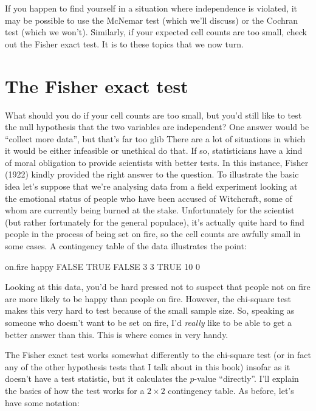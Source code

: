 \noindent
If you happen to find yourself in a situation where independence is violated, it may be possible to use the McNemar test (which we'll discuss) or the Cochran test (which we won't). Similarly, if your expected cell counts are too small, check out the Fisher exact test. It is to these topics that we now turn. 


\section{The Fisher exact test~\label{sec:fisherexacttest}}

What should you do if your cell counts are too small, but you'd still like to test the null hypothesis that the two variables are independent? One answer would be ``collect more data'', but that's far too glib There are a lot of situations in which it would be either infeasible or unethical do that. If so, statisticians have a kind of moral obligation to provide scientists with better tests. In this instance, Fisher (1922) kindly provided the right answer to the question. To illustrate the basic idea let's suppose that we're analysing data from a field experiment looking at the emotional status of people who have been accused of Witchcraft, some of whom are currently being burned at the stake. Unfortunately for the scientist (but rather fortunately for the general populace), it's actually quite hard to find people in the process of being set on fire, so the cell counts are awfully small in some cases. A contingency table of the  data illustrates the point:

\begin{rblock1}
       on.fire
happy   FALSE TRUE
  FALSE     3    3
  TRUE     10    0
\end{rblock1}

Looking at this data, you'd be hard pressed not to suspect that people not on fire are more likely to be happy than people on fire. However, the chi-square test makes this very hard to test because of the small sample size. So, speaking as someone who doesn't want to be set on fire, I'd {\it really} like to be able to get a better answer than this. This is where  \parencite{Fisher1922} comes in very handy. 

The Fisher exact test works somewhat differently to the chi-square test (or in fact any of the other hypothesis tests that I talk about in this book) insofar as it doesn't have a test statistic, but it calculates the $p$-value ``directly''. I'll explain the basics of how the test works for a $2 \times 2$ contingency table. As before, let's have some notation: 

